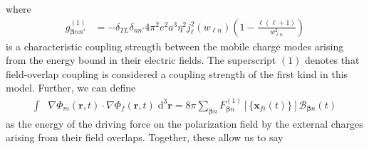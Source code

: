 \documentclass{article}
\begin{document}
where
\begin{equation}
\begin{split}
g_{\bm{\beta}nn'}^{(1)} 
&= -\delta_{TL}\delta_{nn'}4\pi^2e^2a^3\eta^2j_\ell^2(w_{\ell n})\left(1 - \frac{\ell(\ell + 1)}{w_{\ell n}^2}\right)
\end{split}
\end{equation}
is a characteristic coupling strength between the mobile charge modes arising from the energy bound in their electric fields. The superscript $(1)$ denotes that field-overlap coupling is considered a coupling strength of the first kind in this model. Further, we can define
\begin{equation}
\begin{split}
\int&\nabla\Phi_m(\mathbf{r},t)\cdot\nabla\Phi_f(\mathbf{r},t)\;\mathrm{d}^3\mathbf{r} = 8\pi\sum_{\bm{\beta}n}F_{\bm{\beta}n}^{(1)}[\{\mathbf{x}_{fi}(t)\}]\mathcal{B}_{\bm{\beta}n}(t)
\end{split}
\end{equation}
as the energy of the driving force on the polarization field by the external charges arising from their field overlaps. Together, these allow us to say
\end{document}
